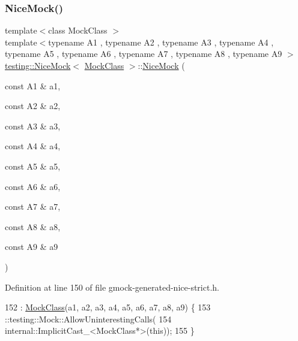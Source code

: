 \subsubsection{\texorpdfstring{Nice\+Mock()}{NiceMock()}\hspace{0.1cm}{\footnotesize\ttfamily [10/11]}}
{\footnotesize\ttfamily template$<$class Mock\+Class $>$ \\
template$<$typename A1 , typename A2 , typename A3 , typename A4 , typename A5 , typename A6 , typename A7 , typename A8 , typename A9 $>$ \\
\hyperlink{classtesting_1_1NiceMock}{testing\+::\+Nice\+Mock}$<$ \hyperlink{classMockClass}{Mock\+Class} $>$\+::\hyperlink{classtesting_1_1NiceMock}{Nice\+Mock} (\begin{DoxyParamCaption}\item[{const A1 \&}]{a1,  }\item[{const A2 \&}]{a2,  }\item[{const A3 \&}]{a3,  }\item[{const A4 \&}]{a4,  }\item[{const A5 \&}]{a5,  }\item[{const A6 \&}]{a6,  }\item[{const A7 \&}]{a7,  }\item[{const A8 \&}]{a8,  }\item[{const A9 \&}]{a9 }\end{DoxyParamCaption})\hspace{0.3cm}{\ttfamily [inline]}}



Definition at line 150 of file gmock-\/generated-\/nice-\/strict.\+h.


\begin{DoxyCode}
152                     : \hyperlink{classMockClass}{MockClass}(a1, a2, a3, a4, a5, a6, a7, a8, a9) \{
153     ::testing::Mock::AllowUninterestingCalls(
154         internal::ImplicitCast\_<MockClass*>(\textcolor{keyword}{this}));
155   \}
\end{DoxyCode}
\mbox{\label{classtesting_1_1NiceMock_a4baf1da52f4c892fc02f6ba10c0b8c02}} 
